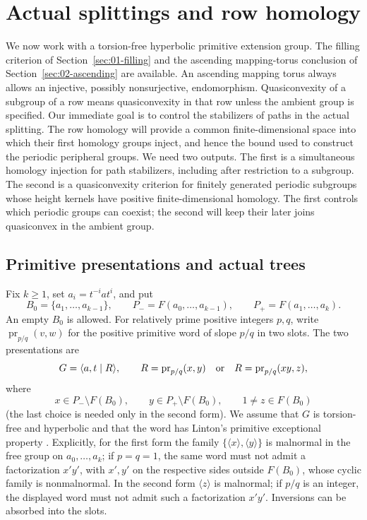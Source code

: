\section{Actual splittings and row homology}\label{sec:03-rows}

We now work with a torsion-free hyperbolic primitive extension group.
The filling criterion of Section~\ref{sec:01-filling} and the ascending
mapping-torus conclusion of Section~\ref{sec:02-ascending} are available.
An ascending mapping torus always allows an injective, possibly
nonsurjective, endomorphism. Quasiconvexity of a subgroup of a row
means quasiconvexity in that row unless the ambient group is specified.
Our immediate goal is to control the stabilizers of paths in the actual
splitting. The row homology will provide a common finite-dimensional
space into which their first homology groups inject, and hence the
bound used to construct the periodic peripheral groups. We need two
outputs. The first is a simultaneous homology injection for path
stabilizers, including after restriction to a subgroup. The second is
a quasiconvexity criterion for finitely generated periodic subgroups
whose height kernels have positive finite-dimensional homology. The
first controls which periodic groups can coexist; the second will
keep their later joins quasiconvex in the ambient group.

\subsection{Primitive presentations and actual trees}

\begin{definition}\label{row:primitive-data}
Fix \(k\geq1\), set \(a_i=t^{-i}at^i\), and put
\[
 B_0=\{a_1,\ldots,a_{k-1}\},\qquad
 P_-=F(a_0,\ldots,a_{k-1}),\qquad
 P_+=F(a_1,\ldots,a_k).
\]
An empty \(B_0\) is allowed. For relatively prime positive integers
\(p,q\), write \(\operatorname{pr}_{p/q}(v,w)\) for the positive
primitive word of slope \(p/q\) in two slots. The two presentations are
\begin{equation}\label{row:primitive-presentations}
 G=\langle a,t\mid R\rangle,\qquad
 R=\operatorname{pr}_{p/q}(x,y)
 \quad\hbox{or}\quad R=\operatorname{pr}_{p/q}(xy,z),
\end{equation}
where
\[
 x\in P_-\setminus F(B_0),\qquad
 y\in P_+\setminus F(B_0),\qquad
 1\neq z\in F(B_0)
\]
(the last choice is needed only in the second form).
We assume that \(G\) is torsion-free and hyperbolic and that the word
has Linton's primitive exceptional property
\cite[Sections~3.1 and~5]{LintonHyperbolic2026}. Explicitly, for the first
form the family \(\{\langle x\rangle,\langle y\rangle\}\) is malnormal
in the free group on \(a_0,\ldots,a_k\); if \(p=q=1\), the same word
must not admit a factorization \(x'y'\), with \(x',y'\) on the respective
sides outside \(F(B_0)\), whose cyclic family is nonmalnormal.
In the second form \(\langle z\rangle\) is malnormal; if \(p/q\) is an
integer, the displayed word must not admit such a factorization
\(x'y'\). Inversions can be absorbed into the slots.
\end{definition}

